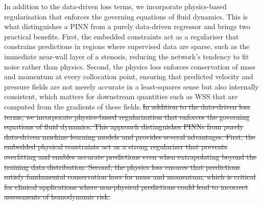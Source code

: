 ﻿\documentclass[12pt,a4paper]{article}
\newcommand{\added}[2][]{\begingroup\color{red}#2\endgroup}
\newcommand{\deleted}[2][]{\begingroup\color{red}\sout{#2}\endgroup}
\newcommand{\replaced}[3][]{\added{#2}\,\deleted{#3}}
\theoremstyle{definition}
\numberwithin{equation}{section}
\begin{document}
{\replaced[id=pinn]{In addition to the data-driven loss terms, we incorporate physics-based regularisation that enforces the governing equations of fluid dynamics. This is what distinguishes a PINN from a purely data-driven regressor and brings two practical benefits. First, the embedded constraints act as a regulariser that constrains predictions in regions where supervised data are sparse, such as the immediate near-wall layer of a stenosis, reducing the network's tendency to fit noise rather than physics. Second, the physics loss enforces conservation of mass and momentum at every collocation point, ensuring that predicted velocity and pressure fields are not merely accurate in a least-squares sense but also internally consistent, which matters for downstream quantities such as WSS that are computed from the gradients of these fields.}{In addition to the data-driven loss terms, we incorporate physics-based regularization that enforces the governing equations of fluid dynamics. This approach distinguishes PINNs from purely data-driven machine learning models and provides several advantages. First, the embedded physical constraints act as a strong regularizer that prevents overfitting and enables accurate predictions even when extrapolating beyond the training data distribution. Second, the physics loss ensures that predictions satisfy fundamental conservation laws for mass and momentum, which is critical for clinical applications where non-physical predictions could lead to incorrect assessments of hemodynamic risk.}

}
\end{document}
